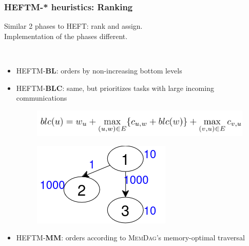 \documentclass[xcolor=svgnames,titlepage,english,presentation]{beamer}
\begin{document}
\begin{frame}[t]
    \frametitle{HEFTM-* heuristics: Ranking}
    
    Similar 2 phases to HEFT: rank and assign. \\[0.5ex]
    Implementation of the phases different.

 ~~~~~
\pause


    \begin{itemize}
        \item HEFTM-\textbf{BL}: orders by non-increasing bottom levels
        \item HEFTM-\textbf{BLC}: same, but prioritizes tasks with large incoming communications \\ 
            \begin{figure}
            \centering
            \includegraphics[scale=0.2]{diagrams/images/BLC-formula.png}
        \end{figure}

        \begin{figure}
            \centering
            \includegraphics[scale=0.3]{diagrams/images/MemTraversal.png}
        \end{figure}
        
        \item HEFTM-\textbf{MM}: orders according to \textsc{MemDag}'s memory-optimal traversal
        
    \end{itemize}
     
 
   

\end{frame}
\end{document}
